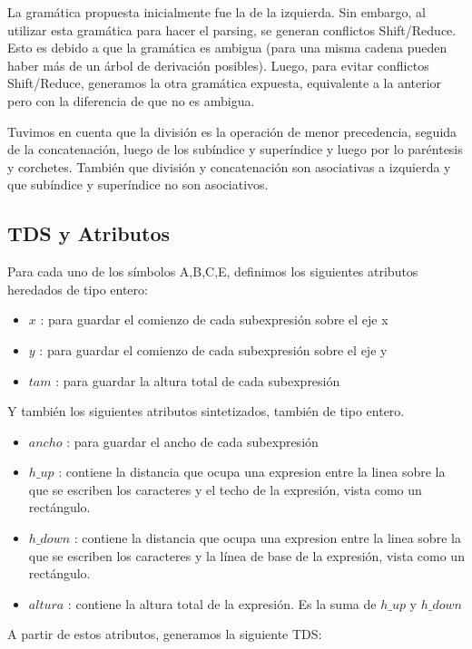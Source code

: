 \documentclass[a4paper, 10pt, twoside]{article}
\begin{document}
La gramática propuesta inicialmente fue la de la izquierda. Sin embargo, al utilizar esta gramática para hacer el parsing, se generan conflictos Shift/Reduce. Esto es debido a que la gramática es ambigua (para una misma cadena pueden haber más de un árbol de derivación posibles). Luego, para evitar conflictos Shift/Reduce, generamos la otra gramática expuesta, equivalente a la anterior pero con la diferencia de que no es ambigua.

Tuvimos en cuenta que la división es la operación de menor precedencia, seguida de la concatenación, luego de los subíndice y superíndice y luego por lo paréntesis y corchetes. También que división y concatenación son asociativas a izquierda y que subíndice y superíndice no son asociativos.

\subsection{TDS y Atributos}
Para cada uno de los símbolos A,B,C,E, definimos los siguientes atributos heredados de tipo entero:
\begin{itemize}
  \item $x$ : para guardar el comienzo de cada subexpresión sobre el eje x
  \item $y$ : para guardar el comienzo de cada subexpresión sobre el eje y
  \item $tam$ : para guardar la altura total de cada subexpresión
\end{itemize}

Y también los siguientes atributos sintetizados, también de tipo entero.
\begin{itemize}
  \item $ancho$ : para guardar el ancho de cada subexpresión
  \item $h\_up$ : contiene la distancia que ocupa una expresion entre la linea sobre la que se escriben los caracteres y el techo de la expresión, vista como un rectángulo.
  \item $h\_down$ : contiene la distancia que ocupa una expresion entre la linea sobre la que se escriben los caracteres y la línea de base de la expresión, vista como un rectángulo.
  \item $altura$ : contiene la altura total de la expresión. Es la suma de $h\_up$ y $h\_down$
\end{itemize}

A partir de estos atributos, generamos la siguiente TDS:


\end{document}

